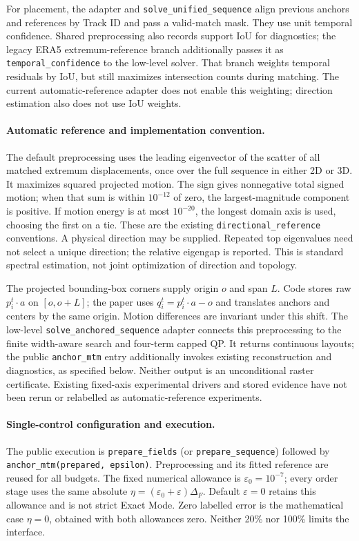 \documentclass{vgtc}                %
\begin{document}
For placement, the adapter and \texttt{solve\_unified\_sequence} align previous anchors and references by Track ID and pass a valid-match mask. They use unit temporal confidence. Shared preprocessing also records support IoU for diagnostics; the legacy ERA5 extremum-reference branch additionally passes it as \texttt{temporal\_confidence} to the low-level solver. That branch weights temporal residuals by IoU, but still maximizes intersection counts during matching. The current automatic-reference adapter does not enable this weighting; direction estimation also does not use IoU weights.

\paragraph{Automatic reference and implementation convention.}
The default preprocessing uses the leading eigenvector of the scatter of all matched extremum displacements, once over the full sequence in either 2D or 3D. It maximizes squared projected motion. The sign gives nonnegative total signed motion; when that sum is within $10^{-12}$ of zero, the largest-magnitude component is positive. If motion energy is at most $10^{-20}$, the longest domain axis is used, choosing the first on a tie. These are the existing \texttt{directional\_reference} conventions. A physical direction may be supplied. Repeated top eigenvalues need not select a unique direction; the relative eigengap is reported. This is standard spectral estimation, not joint optimization of direction and topology.

The projected bounding-box corners supply origin $o$ and span $L$. Code stores raw $p_i^t\cdot a$ on $[o,o+L]$; the paper uses $q_i^t=p_i^t\cdot a-o$ and translates anchors and centers by the same origin. Motion differences are invariant under this shift. The low-level \texttt{solve\_anchored\_sequence} adapter connects this preprocessing to the finite width-aware search and four-term capped QP. It returns continuous layouts; the public \texttt{anchor\_mtm} entry additionally invokes existing reconstruction and diagnostics, as specified below. Neither output is an unconditional raster certificate. Existing fixed-axis experimental drivers and stored evidence have not been rerun or relabelled as automatic-reference experiments.

\paragraph{Single-control configuration and execution.}
The public execution is \texttt{prepare\_fields} (or \texttt{prepare\_sequence}) followed by \texttt{anchor\_mtm(prepared, epsilon)}. Preprocessing and its fitted reference are reused for all budgets. The fixed numerical allowance is $\varepsilon_0=10^{-7}$; every order stage uses the same absolute $\eta=(\varepsilon_0+\varepsilon)\Delta_F$. Default $\varepsilon=0$ retains this allowance and is not strict Exact Mode. Zero labelled error is the mathematical case $\eta=0$, obtained with both allowances zero. Neither 20\% nor 100\% limits the interface.
\end{document}

